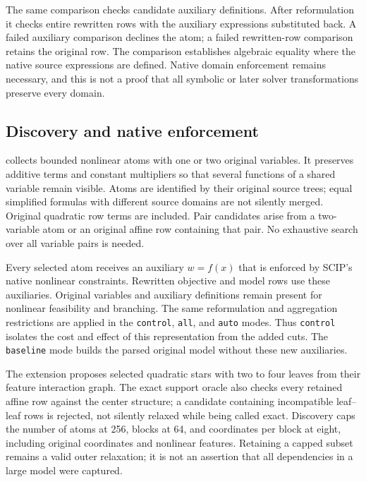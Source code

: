 The same comparison checks candidate auxiliary definitions. After
reformulation it checks entire rewritten rows with the auxiliary
expressions substituted back. A failed auxiliary comparison declines
the atom; a failed rewritten-row comparison retains the original row.
The comparison establishes algebraic equality where the native source
expressions are defined. Native domain enforcement remains necessary,
and this is not a proof that all symbolic or later solver
transformations preserve every domain.

\subsection{Discovery and native enforcement}

 collects
bounded nonlinear atoms with one or two original variables. It preserves
additive terms and constant multipliers so that several functions of a
shared variable remain visible. Atoms are identified by their original
source trees; equal simplified formulas with different source domains
are not silently merged. Original quadratic row terms are included.
Pair candidates arise from a two-variable atom or an original affine
row containing that pair. No exhaustive search over all variable pairs
is needed.

Every selected atom receives an auxiliary $w=f(x)$ that is enforced
by SCIP's native nonlinear constraints. Rewritten objective and model
rows use these auxiliaries. Original variables and auxiliary definitions
remain present for nonlinear feasibility and branching. The same
reformulation and aggregation restrictions are applied in the
\texttt{control}, \texttt{all}, and \texttt{auto} modes. Thus
\texttt{control} isolates the cost and effect of this representation
from the added cuts. The \texttt{baseline} mode builds the parsed
original model without these new auxiliaries.

The extension proposes selected quadratic stars with two to four
leaves from their feature interaction graph. The exact support oracle
also checks every retained affine row against the center structure;
a candidate containing incompatible leaf--leaf rows is rejected, not
silently relaxed while being called exact. Discovery caps the number
of atoms at 256, blocks at 64,
and coordinates per block at eight, including original coordinates and
nonlinear features. Retaining a capped subset remains a valid outer
relaxation; it is not an assertion that all dependencies in a large
model were captured.


